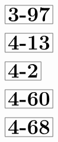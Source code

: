 \documentclass[a4paper, 10pt]{article}
\begin{document}
\begin{minipage}[t]{0.15\textwidth}
                \vspace*{-1.59cm}
        \hspace*{0.75cm}
        $\boxed{\textbf{\Huge3-97}}$
\end{minipage}
\begin{minipage}[t]{0.85\textwidth}
    
\end{minipage}

\begin{minipage}[t]{0.15\textwidth}
                \vspace*{-1.59cm}
        \hspace*{0.75cm}
        $\boxed{\textbf{\Huge4-13}}$
\end{minipage}
\begin{minipage}[t]{0.85\textwidth}
    
\end{minipage}

\begin{minipage}[t]{0.15\textwidth}
                \vspace*{-1.59cm}
        \hspace*{1.25cm}
        $\boxed{\textbf{\Huge4-2}}$
\end{minipage}
\begin{minipage}[t]{0.85\textwidth}
    
\end{minipage}

\begin{minipage}[t]{0.15\textwidth}
                \vspace*{-1.59cm}
        \hspace*{0.75cm}
        $\boxed{\textbf{\Huge4-60}}$
\end{minipage}
\begin{minipage}[t]{0.85\textwidth}
    
\end{minipage}

\begin{minipage}[t]{0.15\textwidth}
                \vspace*{-1.59cm}
        \hspace*{0.75cm}
        $\boxed{\textbf{\Huge4-68}}$
\end{minipage}
\begin{minipage}[t]{0.85\textwidth}
    
\end{minipage}
\end{document}
